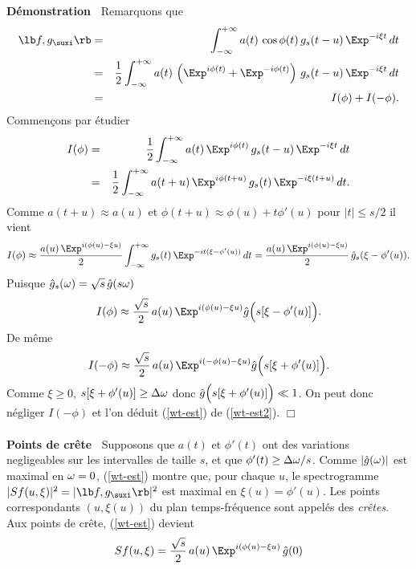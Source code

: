 {\bf D\'emonstration\ }
Remarquons que
\begin{eqnarray*}
\lb f,g_\suxi \rb  &=&
\int_{-\infty}^{+\infty} a(t) \,\cos \phi(t) \,g_s (t-u)\, \Exp^{-i \xi
t}\,dt \\
&=& \frac 1 2
\int_{-\infty}^{+\infty} a(t) \,\left(
\Exp^{i \phi(t)} + \Exp^{-i \phi(t)}\right)
 \,g_s (t-u)\, \Exp^{-i \xi t}\,dt\\
&=& I(\phi) + I(-\phi) .
\end{eqnarray*}
Commen\c{c}ons par \'{e}tudier
\begin{eqnarray*}
I(\phi)  &=& \frac 1 2
\int_{-\infty}^{+\infty} a(t) \,\Exp^{i\phi(t)} \,g_s (t-u)\, \Exp^{-i \xi
t}\,dt \\
&=& \frac 1 2
\int_{-\infty}^{+\infty} a(t+u)\, \Exp^{i \phi(t+u)}\, g_s (t)\, \Exp^{-i \xi
(t+u)}\, dt .
\end{eqnarray*}
Comme $a(t+u) \approx a(u)$ et
$\phi (t+u) \approx \phi(u) + t \phi'(u)$ pour $|t| \leq s/2$
il vient
\[
I(\phi) \approx
\frac {a(u)\, \Exp^{ i (\phi(u) - \xi u)}  } 2
\int_{-\infty}^{+\infty}  g_s (t)\, \Exp^{-i t (\xi - \phi'(u))}
\, dt = 
\frac {a(u)\, \Exp^{ i (\phi(u) - \xi u)}  } 2 \,
\hat g_s (\xi - \phi'(u)) .
\]
Puisque $\hat g_s ({\omega}) = \sqrt s \, \hat g(s {\omega})$ 
\begin{equation}
\label{wt-est2}
I(\phi) \approx
\frac {\sqrt s} 2  \,a(u)\,\Exp^{ i (\phi(u) - \xi u)}
\hat g\Bigl(s[\xi - \phi'(u)]\Bigr) .
\end{equation}
De m\^eme
\[
I(-\phi) \approx
\frac {\sqrt s} 2  \,a(u)\,\Exp^{ i (-\phi(u) - \xi u)}
\hat g\Bigl(s[\xi + \phi'(u)]\Bigr) .
\]
Comme $\xi \geq 0$, $s[\xi + \phi'(u)] \geq \Delta {\omega}$ donc
$\hat g\Bigl(s[\xi + \phi'(u)]\Bigr) \ll 1$. On peut donc
n\'egliger $I(-\phi)$ et l'on d\'eduit (\ref{wt-est}) de
(\ref{wt-est2}).
$\Box$
\\
\\
{\bf Points de cr\^{e}te\ } 
Supposons que $a(t)$ et $\phi'(t)$ ont des variations 
negligeables sur 
les intervalles de taille $s$, et que $\phi'(t) \geq \Delta {\omega}/s$.
Comme $|\hat	g({\omega})|$ est maximal en ${\omega}	= 0$,
(\ref{wt-est}) montre que, pour chaque $u$, le spectrogramme
$|Sf(u,\xi)|^2 =	|\lb f , g_\suxi \rb|^2$ est maximal en
$\xi(u) = \phi'(u)$. Les points correspondants $(u,\xi(u))$ du plan 
temps-fr\'{e}quence sont appel\'{e}s des {\it cr\^{e}tes}.
Aux points de cr\^{e}te, (\ref{wt-est})	devient
\begin{equation}
\label{ridg-wind-fou-ap}
Sf(u, \xi ) = \frac {\sqrt s  } 2 \,a(u)\, \Exp^{ i
(\phi(u) - \xi u)} \, \hat g(0) 
\end{equation}
